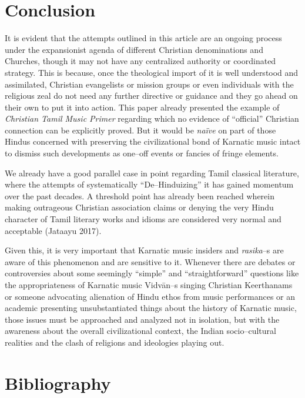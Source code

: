 \section*{Conclusion}

It is evident that the attempts outlined in this article are an ongoing process under the expansionist agenda of different Christian denominations and Churches, though it may not have any centralized authority or coordinated strategy. This is because, once the theological import of it is well understood and assimilated, Christian evangelists or mission groups or even individuals with the religious zeal do not need any further directive or guidance and they go ahead on their own to put it into action. This paper already presented the example of \textit{Christian Tamil Music Primer} regarding which no evidence of “official” Christian connection can be explicitly proved. But it would be \textit{naïve} on part of those Hindus concerned with preserving the civilizational bond of Karnatic music intact to dismiss such developments as one–off events or fancies of fringe elements.

We already have a good parallel case in point regarding Tamil classical literature, where the attempts of systematically “De–Hinduizing” it has gained momentum over the past decades. A threshold point has already been reached wherein making outrageous Christian association claims or denying the very Hindu character of Tamil literary works and idioms are considered very normal and acceptable (Jataayu 2017).

Given this, it is very important that Karnatic music insiders and \textit{rasika}–s are aware of this phenomenon and are sensitive to it. Whenever there are debates or controversies about some seemingly “simple” and “straightforward” questions like the appropriateness of Karnatic music Vidvān–s singing Christian Keerthanams or someone advocating alienation of Hindu ethos from music performances or an academic presenting unsubstantiated things about the history of Karnatic music, those issues must be approached and analyzed not in isolation, but with the awareness about the overall civilizational context, the Indian socio–cultural realities and the clash of religions and ideologies playing out.


\section*{Bibliography}

